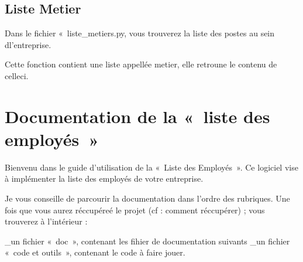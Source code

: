 \documentclass[letterpaper,10pt,french]{sphinxmanual}
\begin{document}
\section{Liste Metier}
\label{\detokenize{Definition_des_fonctions:module-liste_metier}}\label{\detokenize{Definition_des_fonctions:liste-metier}}
\sphinxAtStartPar
Dans le fichier « liste\_metiers.py, vous trouverez la liste des postes au sein dl’entreprise.

\begin{fulllineitems}
\label{\detokenize{Definition_des_fonctions:liste_metier.metiers}}
\pysigstartsignatures
{}
\pysigstopsignatures
\sphinxAtStartPar
Cette fonction contient une liste appellée metier, elle retroune le contenu de celle\sphinxhyphen{}ci.

\end{fulllineitems}



\chapter{Documentation de la « liste des employés »}
\label{\detokenize{index:documentation-de-la-liste-des-employes}}
\sphinxAtStartPar
Bienvenu dans le guide d’utilisation de la « Liste des Employés ».
Ce logiciel vise à implémenter la liste des employés de votre entreprise.

\sphinxAtStartPar
Je vous conseille de parcourir la documentation dans l’ordre des rubriques.
Une fois que vous aurez réccupéreé le projet (cf : comment réccupérer) ; vous trouverez à l’intérieur :

\sphinxAtStartPar
\_un fichier « doc », contenant les fihier de documentation suivants
\_un fichier « code et outils », contenant le code à faire jouer.


\renewcommand{\indexname}{Index des modules Python}
\begin{sphinxtheindex}
\let\bigletter\sphinxstyleindexlettergroup
\bigletter{b}
\item\relax{}
\indexspace
\bigletter{l}
\item\relax{}
\end{sphinxtheindex}

\renewcommand{\indexname}{Index}
\printindex
\end{document}
